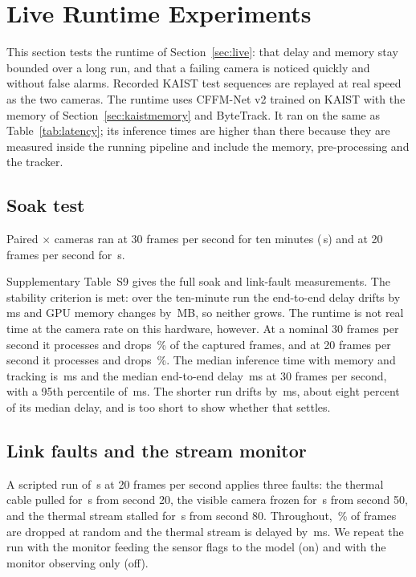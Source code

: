 \section{Live Runtime Experiments}
\label{sec:livexp}
This section tests the runtime of Section~\ref{sec:live}: that delay and memory stay bounded over a long run, and that a failing camera is noticed quickly and without false alarms. Recorded KAIST test sequences are replayed at real speed as the two cameras. The runtime uses CFFM-Net v2 trained on KAIST with the memory of Section~\ref{sec:kaistmemory} and ByteTrack. It ran on the same \latLocalDevice{} as Table~\ref{tab:latency}; its inference times are higher than there because they are measured inside the running pipeline and include the memory, pre-processing and the tracker.

\subsection{Soak test}
\label{sec:soak}
Paired \cfgLatW{}$\times$\cfgLatH{} cameras ran at 30 frames per second for ten minutes (\livSoakThirtySeconds{}\,s) and at 20 frames per second for \cfgSoakShortSeconds{}\,s.

Supplementary Table~S9 gives the full soak and link-fault measurements. The stability criterion is met: over the ten-minute run the end-to-end delay drifts by \livSoakThirtyDriftMs{}\,ms and GPU memory changes by \livSoakThirtyGpuGrowthMb{}\,MB, so neither grows. The runtime is not real time at the camera rate on this hardware, however. At a nominal 30 frames per second it processes \livSoakThirtyFps{} and drops \livSoakThirtyDropPercent{}\,\% of the captured frames, and at 20 frames per second it processes \livSoakTwentyFps{} and drops \livSoakTwentyDropPercent{}\,\%. The median inference time with memory and tracking is \livSoakThirtyInferMedianMs{}\,ms and the median end-to-end delay \livSoakThirtyEndToEndMedianMs{}\,ms at 30 frames per second, with a 95th percentile of \livSoakThirtyEndToEndPNinetyFiveMs{}\,ms. The shorter run drifts by \livSoakTwentyDriftMs{}\,ms, about eight percent of its median delay, and is too short to show whether that settles.

\subsection{Link faults and the stream monitor}
\label{sec:linkfaults}
A scripted run of \cfgLinkSeconds{}\,s at 20 frames per second applies three faults: the thermal cable pulled for \cfgUnplugSeconds{}\,s from second 20, the visible camera frozen for \cfgUnplugSeconds{}\,s from second 50, and the thermal stream stalled for \cfgStallSeconds{}\,s from second 80. Throughout, \cfgLinkDropPercent{}\,\% of frames are dropped at random and the thermal stream is delayed by \cfgLinkDelayMs{}\,ms. We repeat the run with the monitor feeding the sensor flags to the model (on) and with the monitor observing only (off).

